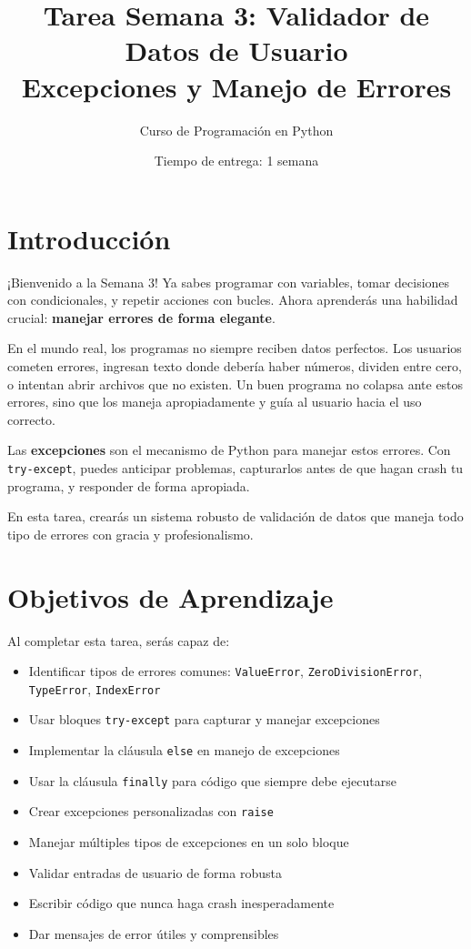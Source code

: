 \documentclass[12pt,a4paper]{article}
\title{\textbf{Tarea Semana 3: Validador de Datos de Usuario}\\
\large Excepciones y Manejo de Errores}
\author{Curso de Programación en Python}
\date{Tiempo de entrega: 1 semana}
\begin{document}
\maketitle

\section{Introducción}

¡Bienvenido a la Semana 3! Ya sabes programar con variables, tomar decisiones con condicionales, y repetir acciones con bucles. Ahora aprenderás una habilidad crucial: \textbf{manejar errores de forma elegante}.

En el mundo real, los programas no siempre reciben datos perfectos. Los usuarios cometen errores, ingresan texto donde debería haber números, dividen entre cero, o intentan abrir archivos que no existen. Un buen programa no colapsa ante estos errores, sino que los maneja apropiadamente y guía al usuario hacia el uso correcto.

Las \textbf{excepciones} son el mecanismo de Python para manejar estos errores. Con \texttt{try-except}, puedes anticipar problemas, capturarlos antes de que hagan crash tu programa, y responder de forma apropiada.

En esta tarea, crearás un sistema robusto de validación de datos que maneja todo tipo de errores con gracia y profesionalismo.

\section{Objetivos de Aprendizaje}

Al completar esta tarea, serás capaz de:

\begin{itemize}[leftmargin=*]
    \item Identificar tipos de errores comunes: \texttt{ValueError}, \texttt{ZeroDivisionError}, \texttt{TypeError}, \texttt{IndexError}
    \item Usar bloques \texttt{try-except} para capturar y manejar excepciones
    \item Implementar la cláusula \texttt{else} en manejo de excepciones
    \item Usar la cláusula \texttt{finally} para código que siempre debe ejecutarse
    \item Crear excepciones personalizadas con \texttt{raise}
    \item Manejar múltiples tipos de excepciones en un solo bloque
    \item Validar entradas de usuario de forma robusta
    \item Escribir código que nunca haga crash inesperadamente
    \item Dar mensajes de error útiles y comprensibles
\end{itemize}
\end{document}

